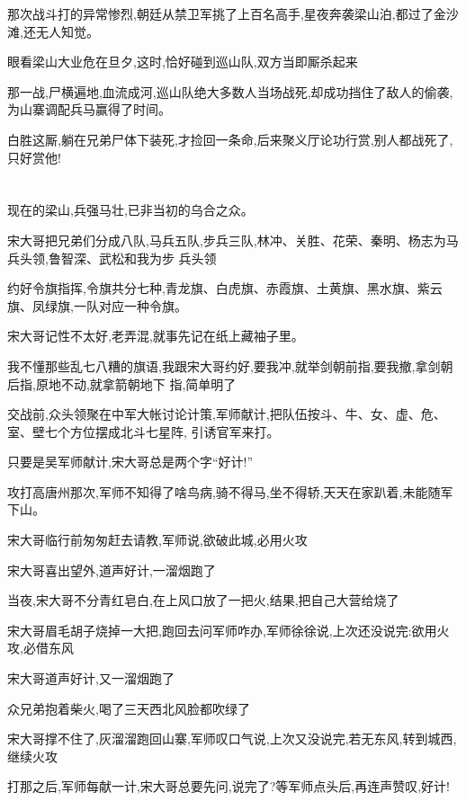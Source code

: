 ﻿\documentclass[12pt]{article}
\begin{document}
那次战斗打的异常惨烈,朝廷从禁卫军挑了上百名高手,星夜奔袭梁山泊,都过了金沙滩,还无人知觉。

眼看梁山大业危在旦夕,这时,恰好碰到巡山队,双方当即厮杀起来

那一战,尸横遍地,血流成河,巡山队绝大多数人当场战死,却成功挡住了敌人的偷袭,为山寨调配兵马赢得了时间。

白胜这厮,躺在兄弟尸体下装死,才捡回一条命,后来聚义厅论功行赏,别人都战死了,只好赏他! 

\section{}

现在的梁山,兵强马壮,已非当初的乌合之众。

宋大哥把兄弟们分成八队,马兵五队,步兵三队,林冲、关胜、花荣、秦明、杨志为马兵头领,鲁智深、武松和我为步
兵头领

约好令旗指挥,令旗共分七种,青龙旗、白虎旗、赤霞旗、土黄旗、黑水旗、紫云旗、凤绿旗,一队对应一种令旗。

宋大哥记性不太好,老弄混,就事先记在纸上藏袖子里。

我不懂那些乱七八糟的旗语,我跟宋大哥约好,要我冲,就举剑朝前指,要我撤,拿剑朝后指,原地不动,就拿箭朝地下
指,简单明了

交战前,众头领聚在中军大帐讨论计策,军师献计,把队伍按斗、牛、女、虚、危、室、壁七个方位摆成北斗七星阵,
引诱官军来打。

只要是吴军师献计,宋大哥总是两个字``好计!''

攻打高唐州那次,军师不知得了啥鸟病,骑不得马,坐不得轿,天天在家趴着,未能随军下山。

宋大哥临行前匆匆赶去请教,军师说,欲破此城,必用火攻\dldots

宋大哥喜出望外,道声好计,一溜烟跑了\dldots

当夜,宋大哥不分青红皂白,在上风口放了一把火,结果,把自己大营给烧了\dldots

宋大哥眉毛胡子烧掉一大把,跑回去问军师咋办,军师徐徐说,上次还没说完:欲用火攻,必借东风\dldots

宋大哥道声好计,又一溜烟跑了\dldots

众兄弟抱着柴火,喝了三天西北风\dldots 脸都吹绿了\dldots

宋大哥撑不住了,灰溜溜跑回山寨,军师叹口气说,上次又没说完,若无东风,转到城西,继续火攻\dldots

打那之后,军师每献一计,宋大哥总要先问,说完了?等军师点头后,再连声赞叹,好计!
\section{}
\end{document}
